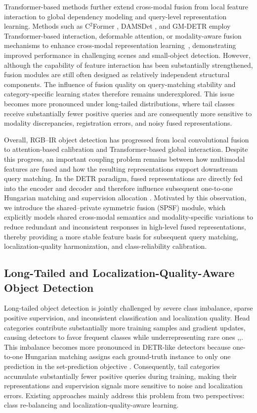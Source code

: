 \documentclass[letterpaper,journal]{IEEEtran}
\begin{document}
Transformer-based methods further extend cross-modal fusion from local feature interaction to global dependency modeling and query-level representation learning. Methods such as C$^2$Former \cite{c2former}, DAMSDet \cite{damsdet}, and GM-DETR \cite{gmdetr} employ Transformer-based interaction, deformable attention, or modality-aware fusion mechanisms to enhance cross-modal representation learning~\cite{wavemamba}, demonstrating improved performance in challenging scenes and small-object detection. However, although the capability of feature interaction has been substantially strengthened, fusion modules are still often designed as relatively independent structural components. The influence of fusion quality on query-matching stability and category-specific learning states therefore remains underexplored. This issue becomes more pronounced under long-tailed distributions, where tail classes receive substantially fewer positive queries and are consequently more sensitive to modality discrepancies, registration errors, and noisy fused representations.

Overall, RGB--IR object detection has progressed from local convolutional fusion to attention-based calibration and Transformer-based global interaction. Despite this progress, an important coupling problem remains between how multimodal features are fused and how the resulting representations support downstream query matching. In the DETR paradigm, fused representations are directly fed into the encoder and decoder and therefore influence subsequent one-to-one Hungarian matching and supervision allocation \cite{detr,rtdetr}. Motivated by this observation, we introduce the shared--private symmetric fusion (SPSF) module, which explicitly models shared cross-modal semantics and modality-specific variations to reduce redundant and inconsistent responses in high-level fused representations, thereby providing a more stable feature basis for subsequent query matching, localization-quality harmonization, and class-reliability calibration.

\subsection{Long-Tailed and Localization-Quality-Aware Object Detection}
Long-tailed object detection is jointly challenged by severe class imbalance, sparse positive supervision, and inconsistent classification and localization quality. Head categories contribute substantially more training samples and gradient updates, causing detectors to favor frequent classes while underrepresenting rare ones \cite{lvis},\cite{bags},\cite{gaussian_logit}. This imbalance becomes more pronounced in DETR-like detectors because one-to-one Hungarian matching assigns each ground-truth instance to only one prediction in the set-prediction objective \cite{detr}. Consequently, tail categories accumulate substantially fewer positive queries during training, making their representations and supervision signals more sensitive to noise and localization errors. Existing approaches mainly address this problem from two perspectives: class re-balancing and localization-quality-aware learning.
\end{document}
